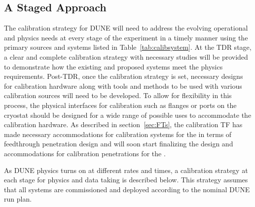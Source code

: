 \subsection{A Staged Approach}
The calibration strategy for DUNE will need to address the evolving operational and physics needs at every stage of the experiment in a timely manner using the primary sources and systems listed in Table~\ref{tab:calibsystem}. At the TDR stage, a clear and complete calibration strategy with necessary studies will be provided to demonstrate %
how the existing and proposed systems meet the physics requirements.
 Post-TDR, once the calibration strategy is set, necessary designs for calibration hardware along with tools and methods to be used with various calibration sources will need to be developed. To allow for flexibility in this process, the physical interfaces for calibration such as flanges or ports on the cryostat should be designed for a wide range of possible uses to accommodate the calibration hardware. As described in section~\ref{sec:FTs}, the calibration TF has made necessary accommodations for calibration systems for the  in terms of feedthrough penetration design and will soon start finalizing the design and accommodations for calibration penetrations for the . 

As DUNE physics turns on at different rates and times, a calibration strategy at each stage for physics and data taking is described below. This strategy assumes that all systems are commissioned and deployed according to the nominal DUNE run plan. 

